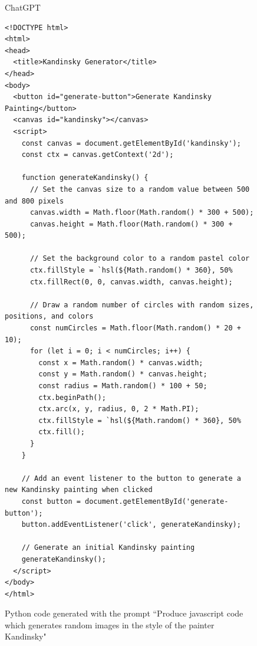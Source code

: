\begin{figure}[H]
\begin{AIbox}{ChatGPT}
\begin{verbatim}
<!DOCTYPE html>
<html>
<head>
  <title>Kandinsky Generator</title>
</head>
<body>
  <button id="generate-button">Generate Kandinsky Painting</button>
  <canvas id="kandinsky"></canvas>
  <script>
    const canvas = document.getElementById('kandinsky');
    const ctx = canvas.getContext('2d');

    function generateKandinsky() {
      // Set the canvas size to a random value between 500 and 800 pixels
      canvas.width = Math.floor(Math.random() * 300 + 500);
      canvas.height = Math.floor(Math.random() * 300 + 500);

      // Set the background color to a random pastel color
      ctx.fillStyle = `hsl(${Math.random() * 360}, 50%
      ctx.fillRect(0, 0, canvas.width, canvas.height);

      // Draw a random number of circles with random sizes, positions, and colors
      const numCircles = Math.floor(Math.random() * 20 + 10);
      for (let i = 0; i < numCircles; i++) {
        const x = Math.random() * canvas.width;
        const y = Math.random() * canvas.height;
        const radius = Math.random() * 100 + 50;
        ctx.beginPath();
        ctx.arc(x, y, radius, 0, 2 * Math.PI);
        ctx.fillStyle = `hsl(${Math.random() * 360}, 50%
        ctx.fill();
      }
    }

    // Add an event listener to the button to generate a new Kandinsky painting when clicked
    const button = document.getElementById('generate-button');
    button.addEventListener('click', generateKandinsky);

    // Generate an initial Kandinsky painting
    generateKandinsky();
  </script>
</body>
</html>
\end{verbatim}
\end{AIbox}
	\caption{Python code generated with the prompt ``Produce javascript code which generates random images in the style of the painter Kandinsky"}
	\label{fig:artprog2}
\end{figure}

